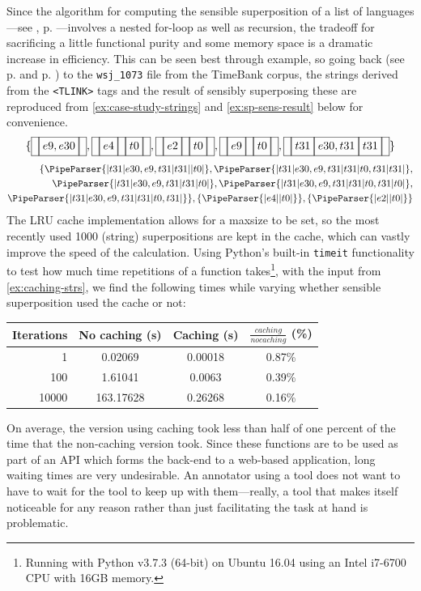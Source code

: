 \documentclass[a4paper,12pt,leqno,twoside]{article}
\newcommand{\vph}[1]{\vphantom{#1}}
\newcommand{\ebox}[1]{\fbox{$\vph{'(),}#1$}}
\newcommand{\nbBefore}[2]{\ebox{#1}\ebox{}\ebox{#2}}
\newcommand{\nbDuring}[2]{\ebox{#2}\ebox{#1,#2}\ebox{#2}}
\newcommand{\nbEquals}[2]{\ebox{#1,#2}}
\newcommand{\Before}[2]{\ebox{}\nbBefore{#1}{#2}\ebox{}}
\newcommand{\During}[2]{\ebox{}\nbDuring{#1}{#2}\ebox{}}
\newcommand{\Equals}[2]{\ebox{}\nbEquals{#1}{#2}\ebox{}}
\newcommand{\EventString}[1]{%
	\renewcommand*{\do}[1]{\ebox{##1}}%
	\PipeParser{#1}%
}
\begin{document}
Since the algorithm for computing the sensible superposition of a list of languages---see , p. \pageref{fig:pseudo-code-spsens}---involves a nested for-loop as well as recursion, the tradeoff for sacrificing a little functional purity and some memory space is a dramatic increase in efficiency. This can be seen best through example, so going back (see p. \pageref{fig:case-study-tlinks} and p. \pageref{ex:validate-wsj}) to the \verb|wsj_1073| file from the TimeBank corpus, the strings derived from the \verb|<TLINK>| tags and the result of sensibly superposing these are reproduced from \cref{ex:case-study-strings} and \cref{ex:sp-sens-result} below for convenience.
\begin{align}
	\{\Equals{e9}{e30}, \Before{e4}{t0}, \Before{e2}{t0}, \Before{e9}{t0}, \During{e30}{t31}\}\label{ex:caching-strs}
\end{align}
\begin{align}
	\{\EventString{{}|t31|e30,e9,t31|t31|{}|t0|{}}, \EventString{{}|t31|e30,e9,t31|t31|t0,t31|t31|{}},\\
	\EventString{{}|t31|e30,e9,t31|t31|t0|{}}, \EventString{{}|t31|e30,e9,t31|t31|t0,t31|t0|{}},\notag\\
	\EventString{{}|t31|e30,e9,t31|t31|t0,t31|{}}\}, \{\EventString{{}|e4|{}|t0|{}}\}, \{\EventString{{}|e2|{}|t0|{}}\}\notag
\end{align}
The LRU cache implementation allows for a maxsize to be set, so the most recently used 1000 (string) superpositions are kept in the cache, which can vastly improve the speed of the calculation. Using Python's built-in \verb|timeit| functionality to test how much time repetitions of a function takes\footnote{Running with Python v3.7.3 (64-bit) on Ubuntu 16.04 using an Intel i7-6700 CPU with 16GB memory.}, with the input from \cref{ex:caching-strs}, we find the following times while varying whether sensible superposition used the cache or not:
\begin{center}
	\footnotesize
	\begin{tabular}[h!]{|r|c  c  c|}
		\hline
		\textbf{Iterations} & \textbf{No caching (s)} & \textbf{Caching (s)} & $\frac{caching}{no caching}$ (\%)\\
		\hline
		1 & 0.02069 & 0.00018 & 0.87\%\\
		100 & 1.61041 & 0.0063 & 0.39\%\\%
		10000 & 163.17628 & 0.26268 & 0.16\%\\%
		\hline
	\end{tabular}
\end{center}
On average, the version using caching took less than half of one percent of the time that the non-caching version took. Since these functions are to be used as part of an API which forms the back-end to a web-based application, long waiting times are very undesirable. An annotator using a tool does not want to have to wait for the tool to keep up with them---really, a tool that makes itself noticeable for any reason rather than just facilitating the task at hand is problematic.
\end{document}
